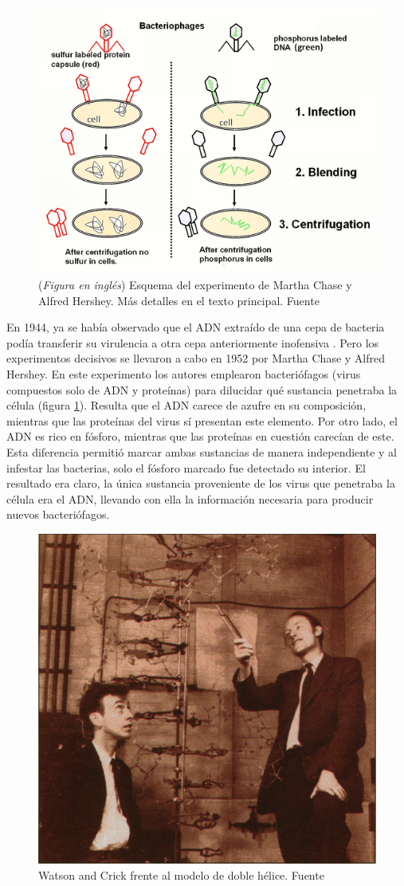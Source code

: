 \begin{figure}[bb]
   \centering
   \includegraphics[width=0.6\columnwidth]{images/Martha_Chase_and_Alfred_Hershey_Experiment.png}
   \caption{(\textit{Figura en inglés}) Esquema del experimento de Martha Chase y Alfred Hershey. Más detalles en el texto principal. Fuente \cite{wiki:Alfred_Hershey_and_Martha_Chase_Experiment}}
   \label{fig:Martha_and_Hershey_Experiment}
\end{figure}

En 1944, ya se había observado que el ADN extraído de una cepa de bacteria podía transferir su virulencia a otra cepa anteriormente inofensiva \cite{averySTUDIESCHEMICALNATURE1944}.
Pero los experimentos decisivos se llevaron a cabo en 1952 por Martha Chase y Alfred Hershey.
En este experimento \cite{hersheyIndependentFunctionsViral1952} los autores emplearon bacteriófagos (virus compuestos solo de ADN y proteínas) para dilucidar qué sustancia penetraba la célula (figura \ref{fig:Martha_and_Hershey_Experiment}).
Resulta que el ADN carece de azufre en su composición, mientras que las proteínas del virus sí presentan este elemento.
Por otro lado, el ADN es rico en fósforo, mientras que las proteínas en cuestión carecían de este.
Esta diferencia permitió marcar ambas sustancias de manera independiente y al infestar las bacterias, solo el fósforo marcado fue detectado su interior.
El resultado era claro, la única sustancia proveniente de los virus que penetraba la célula era el ADN, llevando con ella la información necesaria para producir nuevos bacteriófagos.
 
\begin{figure}[tb]
   \centering
   \includegraphics[width=0.6\columnwidth]{images/Watson_and_Crick.png}
   \caption{Watson and Crick frente al modelo de doble hélice. Fuente \cite{hallOldSchoolTies1993}}
   \label{fig:Watson_and_Crick}
\end{figure}
 
